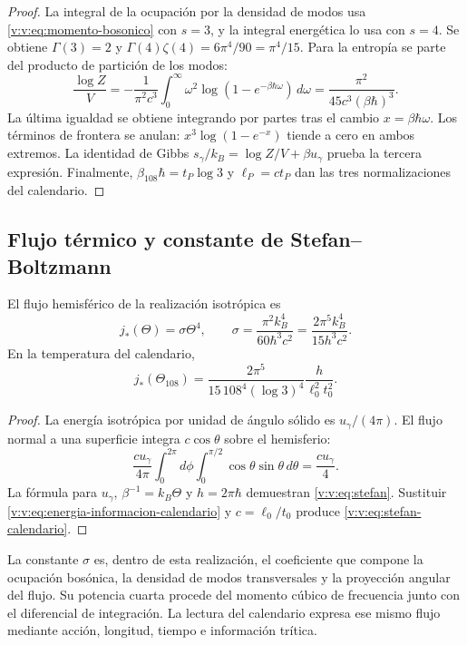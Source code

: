 \begin{proof}
La integral de la ocupación por la densidad de modos usa
\eqref{v:v:eq:momento-bosonico} con \(s=3\), y la integral energética
lo usa con \(s=4\). Se obtiene \(\Gamma(3)=2\) y
\(\Gamma(4)\zeta(4)=6\pi^4/90=\pi^4/15\).
Para la entropía se parte del producto de partición de los modos:
\[
 \frac{\log Z}{V}=-\frac{1}{\pi^2c^3}
 \int_0^\infty\omega^2
 \log(1-e^{-\beta\hbar\omega})\,d\omega
 =\frac{\pi^2}{45c^3(\beta\hbar)^3}.
\]
La última igualdad se obtiene integrando por partes tras el cambio
\(x=\beta\hbar\omega\). Los términos de frontera se anulan:
\(x^3\log(1-e^{-x})\) tiende a cero en ambos extremos.
La identidad de Gibbs \(s_\gamma/k_B=\log Z/V+\beta u_\gamma\)
prueba la tercera expresión. Finalmente,
\(\beta_{108}\hbar=t_P\log3\) y \(\ell_P=ct_P\) dan las tres
normalizaciones del calendario.
\end{proof}

\subsection{Flujo térmico y constante de Stefan--Boltzmann}

\begin{proposition}
\label{v:v:prop:stefan}
El flujo hemisférico de la realización isotrópica es
\begin{equation}
 j_*(\Theta)=\sigma\Theta^4,\qquad
 \sigma=\frac{\pi^2 k_B^4}{60\hbar^3c^2}
 =\frac{2\pi^5k_B^4}{15h^3c^2}.
 \label{v:v:eq:stefan}
\end{equation}
En la temperatura del calendario,
\begin{equation}
 j_*(\Theta_{108})
 =\frac{2\pi^5}{15\,108^4(\log3)^4}
 \frac{h}{\ell_0^2t_0^2}.
 \label{v:v:eq:stefan-calendario}
\end{equation}
\end{proposition}
\begin{proof}
La energía isotrópica por unidad de ángulo sólido es
\(u_\gamma/(4\pi)\). El flujo normal a una superficie integra
\(c\cos\theta\) sobre el hemisferio:
\[
 \frac{cu_\gamma}{4\pi}
 \int_0^{2\pi}\!d\phi\int_0^{\pi/2}\cos\theta\sin\theta\,d\theta
 =\frac{cu_\gamma}{4}.
\]
La fórmula para \(u_\gamma\), \(\beta^{-1}=k_B\Theta\) y
\(h=2\pi\hbar\) demuestran \eqref{v:v:eq:stefan}.
Sustituir \eqref{v:v:eq:energia-informacion-calendario} y
\(c=\ell_0/t_0\) produce \eqref{v:v:eq:stefan-calendario}.
\end{proof}

La constante \(\sigma\) es, dentro de esta realización, el coeficiente
que compone la ocupación bosónica, la densidad de modos transversales y
la proyección angular del flujo. Su potencia cuarta procede del momento
cúbico de frecuencia junto con el diferencial de integración. La lectura
del calendario expresa ese mismo flujo mediante acción, longitud,
tiempo e información trítica.

